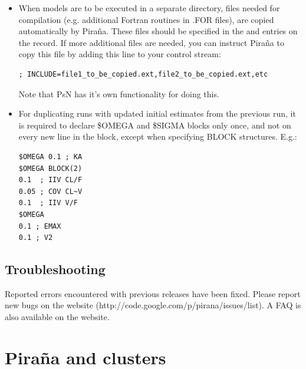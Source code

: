 \documentclass[a4,11pt]{report} \usepackage[pdftex]{graphicx}
\begin{document}
{\begin{itemize}
\begin{verbatim}
$THETA
(3, 5, 11) ; CL/F
(10, 50, 100) ; V/F
\end{verbatim}

To correctly read a covariance block, the covariance term needs to be
specified as `COV', e.g.

\begin{verbatim}
$OMEGA BLOCK(2)
0.1 ; IIV CL/F
0.05 ; COV CL~V
0.1 ; IIV V/F
\end{verbatim}

\item When models are to be executed in a separate directory, files
needed for compilation (e.g. additional Fortran routines in
.FOR files), are copied automatically by Pira\~na. These files should
be specified in the  \normalfont and 
\normalfont entries on the  \normalfont record. If
more additional files are needed, you can instruct Pira\~na to copy this
file by adding this line to your control stream:
\begin{verbatim}
; INCLUDE=file1_to_be_copied.ext,file2_to_be_copied.ext,etc
\end{verbatim}

Note that PsN has it's own functionality for doing this.

\item For duplicating runs with updated initial estimates from the
previous run, it is required to declare \$OMEGA and \$SIGMA blocks
only once, and not on every new line in the block, except when
specifying BLOCK structures. E.g.:

\begin{verbatim}
$OMEGA 0.1 ; KA
$OMEGA BLOCK(2)
0.1  ; IIV CL/F
0.05 ; COV CL~V
0.1  ; IIV V/F
$OMEGA
0.1 ; EMAX
0.1 ; V2
\end{verbatim}

\end{itemize}

\section{Troubleshooting}

Reported errors encountered with previous releases have been
fixed. Please report new bugs on the website
(http://code.google.com/p/pirana/issues/list). A FAQ is also
available on the website.



\chapter{Pira\~na and clusters}

}
\end{document}
